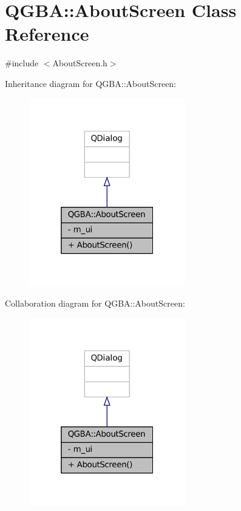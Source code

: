 \hypertarget{class_q_g_b_a_1_1_about_screen}{}\section{Q\+G\+BA\+:\+:About\+Screen Class Reference}
\label{class_q_g_b_a_1_1_about_screen}


{\ttfamily \#include $<$About\+Screen.\+h$>$}



Inheritance diagram for Q\+G\+BA\+:\+:About\+Screen\+:
\nopagebreak
\begin{figure}[H]
\begin{center}
\leavevmode
\includegraphics[width=193pt]{class_q_g_b_a_1_1_about_screen__inherit__graph}
\end{center}
\end{figure}


Collaboration diagram for Q\+G\+BA\+:\+:About\+Screen\+:
\nopagebreak
\begin{figure}[H]
\begin{center}
\leavevmode
\includegraphics[width=193pt]{class_q_g_b_a_1_1_about_screen__coll__graph}
\end{center}
\end{figure}
